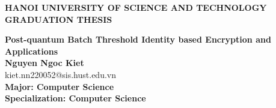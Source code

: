 \newcommand{\underwrite}[3][]{%
  \genfrac{}{}{#1}{}{\textstyle #2}{\scriptstyle #3}
}
\begin{titlepage}
\thispagestyle{empty}
\begin{center}

{\textbf{\large{HANOI UNIVERSITY OF SCIENCE AND TECHNOLOGY}}}\\[4cm]

{\textbf{\huge{ GRADUATION THESIS}}}\\[1cm]
{\textbf{\Large{Post-quantum Batch Threshold Identity based Encryption and Applications}}\\[1cm]

{\textbf{\large{Nguyen Ngoc Kiet}}}\\
{\large{kiet.nn220052@sis.hust.edu.vn}}\\[0.5cm]

{\textbf{\large{Major: Computer Science }}}\\
{\textbf{\large{Specialization: Computer Science }}}\\

\vspace{2cm}
\begin{table}[H]
\centering
{}
\end{table}}
\end{center}



\end{titlepage}


